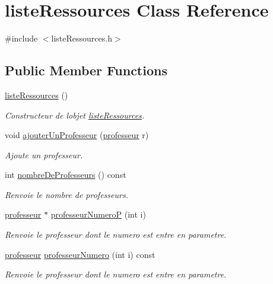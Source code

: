 \hypertarget{classliste_ressources}{}\section{liste\+Ressources Class Reference}
\label{classliste_ressources}


{\ttfamily \#include $<$liste\+Ressources.\+h$>$}

\subsection*{Public Member Functions}
\begin{DoxyCompactItemize}
\item 
\hyperlink{classliste_ressources_a3f49a0916898d200295e0e6593253e73}{liste\+Ressources} ()
\begin{DoxyCompactList}\small\item\em Constructeur de l\textquotesingle{}objet \hyperlink{classliste_ressources}{liste\+Ressources}. \end{DoxyCompactList}\item 
void \hyperlink{classliste_ressources_afb8d1bb96971684ed945622b462fcd5d}{ajouter\+Un\+Professeur} (\hyperlink{classprofesseur}{professeur} r)
\begin{DoxyCompactList}\small\item\em Ajoute un professeur. \end{DoxyCompactList}\item 
int \hyperlink{classliste_ressources_a9b496a36a9651347734d7895397dde00}{nombre\+De\+Professeurs} () const
\begin{DoxyCompactList}\small\item\em Renvoie le nombre de professeurs. \end{DoxyCompactList}\item 
\hyperlink{classprofesseur}{professeur} $\ast$ \hyperlink{classliste_ressources_a48e60720782a54d95bbc708cac235951}{professeur\+NumeroP} (int i)
\begin{DoxyCompactList}\small\item\em Renvoie le professeur dont le numero est entre en parametre. \end{DoxyCompactList}\item 
\hyperlink{classprofesseur}{professeur} \hyperlink{classliste_ressources_af6a22c9c36348e23b1bac9682e280d54}{professeur\+Numero} (int i) const
\begin{DoxyCompactList}\small\item\em Renvoie le professeur dont le numero est entre en parametre. \end{DoxyCompactList}\item 

\end{DoxyCompactItemize}
